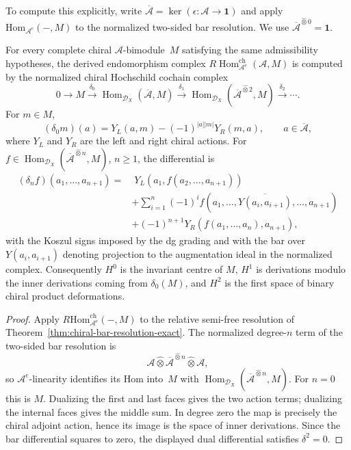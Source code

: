 To compute this explicitly, write
$\overline{\mathcal A}=\ker(\epsilon\colon\mathcal A\to\mathbf1)$
and apply $\text{Hom}_{\mathcal{A}^e}(-, M)$ to the normalized
two-sided bar resolution.  We use
$\overline{\mathcal A}^{\widehat\otimes0}=\mathbf1$.

\begin{theorem}
\label{thm:chiral-hochschild-complex}
For every complete chiral $\mathcal A$-bimodule~$M$ satisfying the
same admissibility hypotheses, the derived endomorphism complex
$R\!\operatorname{Hom}_{\mathcal A^e}^{\mathrm{ch}}(\mathcal A,M)$
is computed by the normalized chiral Hochschild cochain complex
\[
0 \to M \xrightarrow{\delta_0}
\operatorname{Hom}_{\mathcal{D}_X}(\overline{\mathcal A},M)
\xrightarrow{\delta_1}
\operatorname{Hom}_{\mathcal{D}_X}
(\overline{\mathcal A}^{\widehat\otimes2},M)
\xrightarrow{\delta_2}\cdots .
\]
For $m\in M$,
\[
(\delta_0m)(a)=Y_L(a,m)-(-1)^{|a||m|}Y_R(m,a),
\qquad a\in\overline{\mathcal A},
\]
where $Y_L$ and $Y_R$ are the left and right chiral actions.  For
$f\in\operatorname{Hom}_{\mathcal D_X}
(\overline{\mathcal A}^{\widehat\otimes n},M)$, $n\ge1$, the
differential is
\begin{align}
(\delta_n f)(a_1,\ldots,a_{n+1})
=&\;Y_L(a_1,f(a_2,\ldots,a_{n+1})) \nonumber\\
&+\sum_{i=1}^{n}(-1)^i
  f(a_1,\ldots,\overline{Y(a_i,a_{i+1})},\ldots,a_{n+1}) \nonumber\\
&+(-1)^{n+1}Y_R(f(a_1,\ldots,a_n),a_{n+1}),
\end{align}
with the Koszul signs imposed by the dg grading and with the bar over
$Y(a_i,a_{i+1})$ denoting projection to the augmentation ideal in the
normalized complex.  Consequently $H^0$ is the invariant centre of
$M$, $H^1$ is derivations modulo the inner derivations coming from
$\delta_0(M)$, and $H^2$ is the first space of binary chiral product
deformations.
\end{theorem}
\begin{proof}
Apply $R\!\mathrm{Hom}_{\mathcal A^e}^{\mathrm{ch}}(-,M)$ to the
relative semi-free resolution of
Theorem~\ref{thm:chiral-bar-resolution-exact}.  The normalized
degree-$n$ term of the two-sided bar resolution is
\[
\mathcal A\widehat\otimes
\overline{\mathcal A}^{\widehat\otimes n}
\widehat\otimes\mathcal A ,
\]
so $\mathcal A^e$-linearity identifies its Hom into~$M$ with
$\operatorname{Hom}_{\mathcal D_X}
(\overline{\mathcal A}^{\widehat\otimes n},M)$.  For $n=0$ this is
$M$.  Dualizing the first and last faces gives the two action terms;
dualizing the internal faces gives the middle sum.  In degree zero the
map is precisely the chiral adjoint action, hence its image is the
space of inner derivations.  Since the bar differential squares to
zero, the displayed dual differential satisfies $\delta^2=0$.
\end{proof}

